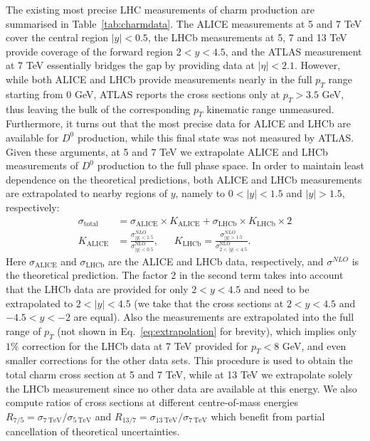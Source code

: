 \documentclass[12pt,a4paper]{article}
\newcommand{\dz}{\ensuremath{D^0}\xspace}
\begin{document}
The existing most precise LHC measurements of charm production are summarised in Table~\ref{tab:charmdata}. The ALICE measurements at 5 and 7 TeV cover the central region $|y| < 0.5$, the LHCb measurements at 5, 7 and 13 TeV provide coverage of the forward region $2<y<4.5$, and the ATLAS measurement at 7 TeV essentially bridges the gap by providing data at $|\eta| < 2.1$. However, while both ALICE and LHCb provide measurements nearly in the full $p_T$ range starting from 0 GeV, ATLAS reports the cross sections only at $p_T > 3.5$ GeV, thus leaving the bulk of the corresponding $p_T$ kinematic range unmeasured. Furthermore, it turns out that the most precise data for ALICE and LHCb are available for \dz production, while this final state was not measured by ATLAS. Given these arguments, at 5 and 7 TeV we extrapolate ALICE and LHCb measurements of \dz production to the full phase space. In order to maintain least dependence on the theoretical predictions, both ALICE and LHCb measurements are extrapolated to nearby regions of $y$, namely to $0<|y|<1.5$ and $|y|>1.5$, respectively:
\begin{equation}
\begin{aligned}
\sigma_{\textrm{total}} &= \sigma_{\textrm{ALICE}} \times K_{\textrm{ALICE}} + \sigma_{\textrm{LHCb}} \times K_{\textrm{LHCb}} \times 2 \\
K_{\textrm{ALICE}} &= \frac{\sigma^{NLO}_{|y|<1.5}}{\sigma^{\textrm{NLO}}_{|y|<0.5}},~~~~~~~
K_{\textrm{LHCb}} = \frac{\sigma^{NLO}_{|y|>1.5}}{\sigma^{\textrm{NLO}}_{2<|y|<4.5}}.
\end{aligned}
\label{eq:extrapolation}
\end{equation}
Here $\sigma_{\textrm{ALICE}}$ and $\sigma_{\textrm{LHCb}}$ are the ALICE and LHCb data, respectively, and $\sigma^{NLO}$ is the theoretical prediction. 
The factor $2$ in the second term takes into account that the LHCb data are provided for only $2<y<4.5$ and need to be extrapolated to $2<|y|<4.5$ (we take that the cross sections at $2<y<4.5$ and $-4.5<y<-2$ are equal).
 Also the measurements are extrapolated into the full range of $p_T$ (not shown in Eq.~\ref{eq:extrapolation} for brevity), which implies only $1\%$ correction for the LHCb data at 7 TeV provided for $p_T < 8$ GeV, and even smaller corrections for the other data sets. This procedure is used to obtain the total charm cross section at 5 and 7 TeV, while at 13 TeV we extrapolate solely the LHCb measurement since no other data are available at this energy. We also compute ratios of cross sections at different centre-of-mass energies $R_{7/5} = \sigma_{7~\textrm{TeV}} / \sigma_{5~\textrm{TeV}}$ and $R_{13/7} = \sigma_{13~\textrm{TeV}} / \sigma_{7~\textrm{TeV}}$ which benefit from partial cancellation of theoretical uncertainties.
\end{document}
